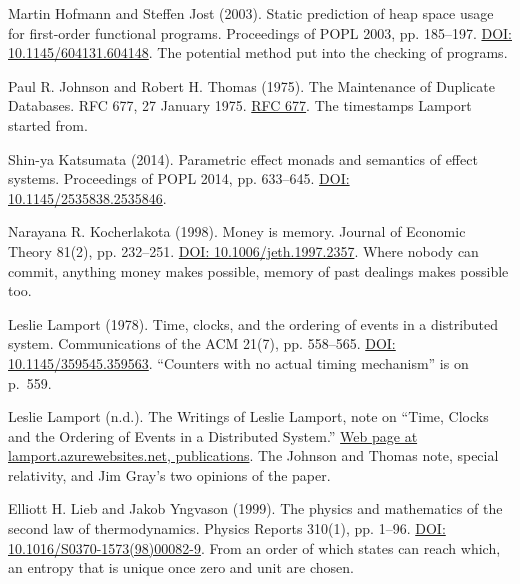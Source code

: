 \documentclass[11pt,twoside]{article}
\theoremstyle{thielethm}
\theoremstyle{thieledef}
\theoremstyle{thieledef}
\theoremstyle{thieledef}
\theoremstyle{thielethm}
\theoremstyle{thieleobs}
\theoremstyle{thielethm}
\begin{document}
\noindent Martin Hofmann and Steffen Jost (2003). Static prediction of heap space usage for first-order functional programs. Proceedings of POPL 2003, pp. 185--197. \href{https://doi.org/10.1145/604131.604148}{DOI: 10.1145/604131.604148}. The potential method put into the checking of programs.
\par\medskip

\noindent Paul R. Johnson and Robert H. Thomas (1975). The Maintenance of Duplicate Databases. RFC 677, 27 January 1975. \href{https://www.rfc-editor.org/rfc/rfc677.html}{RFC 677}. The timestamps Lamport started from.
\par\medskip

\noindent Shin-ya Katsumata (2014). Parametric effect monads and semantics of effect systems. Proceedings of POPL 2014, pp. 633--645. \href{https://doi.org/10.1145/2535838.2535846}{DOI: 10.1145/2535838.2535846}.
\par\medskip

\noindent Narayana R. Kocherlakota (1998). Money is memory. Journal of Economic Theory 81(2), pp. 232--251. \href{https://doi.org/10.1006/jeth.1997.2357}{DOI: 10.1006/jeth.1997.2357}. Where nobody can commit, anything money makes possible, memory of past dealings makes possible too.
\par\medskip

\noindent Leslie Lamport (1978). Time, clocks, and the ordering of events in a distributed system. Communications of the ACM 21(7), pp. 558--565. \href{https://doi.org/10.1145/359545.359563}{DOI: 10.1145/359545.359563}. ``Counters with no actual timing mechanism'' is on p.~559.
\par\medskip

\noindent Leslie Lamport (n.d.). The Writings of Leslie Lamport, note on ``Time, Clocks and the Ordering of Events in a Distributed System.'' \href{https://lamport.azurewebsites.net/pubs/pubs.html}{Web page at lamport.azurewebsites.net, publications}. The Johnson and Thomas note, special relativity, and Jim Gray's two opinions of the paper.
\par\medskip

\noindent Elliott H. Lieb and Jakob Yngvason (1999). The physics and mathematics of the second law of thermodynamics. Physics Reports 310(1), pp. 1--96. \href{https://doi.org/10.1016/S0370-1573(98)00082-9}{DOI: 10.1016/S0370-1573(98)00082-9}. From an order of which states can reach which, an entropy that is unique once zero and unit are chosen.
\par\medskip
\end{document}
